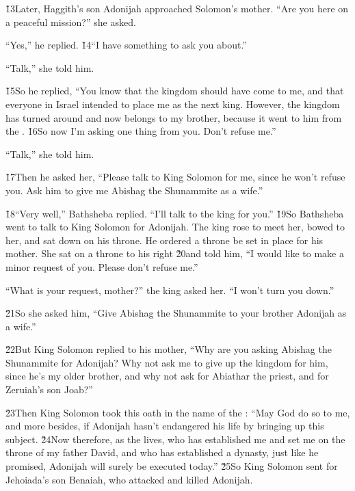\v{13}Later, Haggith's son Adonijah approached Solomon's mother. ``Are you here on a peaceful mission?'' she asked.

``Yes,'' he replied. \v{14}``I have something to ask you about.''

``Talk,'' she told him.

\v{15}So he replied, ``You know that the kingdom should have come to me, and that everyone in Israel intended to place me as the next king. However, the kingdom has turned around and now belongs to my brother, because it went to him from the . \v{16}So now I'm asking one thing from you. Don't refuse me.''

``Talk,'' she told him.

\v{17}Then he asked her, ``Please talk to King Solomon for me, since he won't refuse you. Ask him to give me Abishag the Shunammite as a wife.''

\v{18}``Very well,'' Bathsheba replied. ``I'll talk to the king for you.'' \v{19}So Bathsheba went to talk to King Solomon for Adonijah. The king rose to meet her, bowed to her, and sat down on his throne. He ordered a throne be set in place for his mother. She sat on a throne to his right \v{20}and told him, ``I would like to make a minor request of you. Please don't refuse me.''

``What is your request, mother?'' the king asked her. ``I won't turn you down.''

\v{21}So she asked him, ``Give Abishag the Shunammite to your brother Adonijah as a wife.''

\v{22}But King Solomon replied to his mother, ``Why are you asking Abishag the Shunammite for Adonijah? Why not ask me to give up the kingdom for him, since he's my older brother, and why not ask for Abiathar the priest, and for Zeruiah's son Joab?''

\v{23}Then King Solomon took this oath in the name of the : ``May God do so to me, and more besides, if Adonijah hasn't endangered his life by bringing up this subject. \v{24}Now therefore, as the  lives, who has established me and set me on the throne of my father David, and who has established a dynasty, just like he promised, Adonijah will surely be executed today.'' \v{25}So King Solomon sent for Jehoiada's son Benaiah, who attacked and killed Adonijah.

